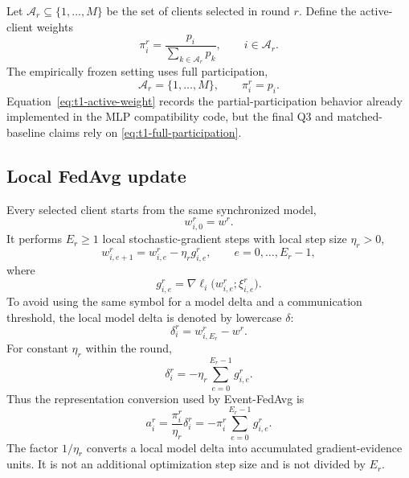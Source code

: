 Let $\mathcal{A}_r\subseteq\{1,\ldots,M\}$ be the set of clients selected in round $r$. Define the active-client weights
\begin{equation}
    \pi_i^r=
    \frac{p_i}{\sum_{k\in\mathcal{A}_r}p_k},
    \qquad i\in\mathcal{A}_r.
    \label{eq:t1-active-weight}
\end{equation}
The empirically frozen setting uses full participation,
\begin{equation}
    \mathcal{A}_r=\{1,\ldots,M\},
    \qquad
    \pi_i^r=p_i.
    \label{eq:t1-full-participation}
\end{equation}
Equation~\eqref{eq:t1-active-weight} records the partial-participation behavior already implemented in the MLP compatibility code, but the final Q3 and matched-baseline claims rely on \eqref{eq:t1-full-participation}.

\subsection{Local FedAvg update}

Every selected client starts from the same synchronized model,
\begin{equation}
    w_{i,0}^r=w^r.
\end{equation}
It performs $E_r\geq1$ local stochastic-gradient steps with local step size $\eta_r>0$,
\begin{equation}
    w_{i,e+1}^r
    =
    w_{i,e}^r
    -
    \eta_r g_{i,e}^r,
    \qquad
    e=0,\ldots,E_r-1,
    \label{eq:t1-local-sgd}
\end{equation}
where
\begin{equation}
    g_{i,e}^r
    =
    \nabla\ell_i\bigl(w_{i,e}^r;\xi_{i,e}^r\bigr).
\end{equation}
To avoid using the same symbol for a model delta and a communication threshold, the local model delta is denoted by lowercase $\delta$:
\begin{equation}
    \delta_i^r
    =
    w_{i,E_r}^r-w^r.
    \label{eq:t1-local-delta}
\end{equation}
For constant $\eta_r$ within the round,
\begin{equation}
    \delta_i^r
    =
    -\eta_r\sum_{e=0}^{E_r-1}g_{i,e}^r.
    \label{eq:t1-delta-gradient-identity}
\end{equation}
Thus the representation conversion used by Event-FedAvg is
\begin{equation}
    a_i^r
    =
    \frac{\pi_i^r}{\eta_r}\delta_i^r
    =
    -\pi_i^r\sum_{e=0}^{E_r-1}g_{i,e}^r.
    \label{eq:t1-evidence-input}
\end{equation}
The factor $1/\eta_r$ converts a local model delta into accumulated gradient-evidence units. It is not an additional optimization step size and is not divided by $E_r$.

